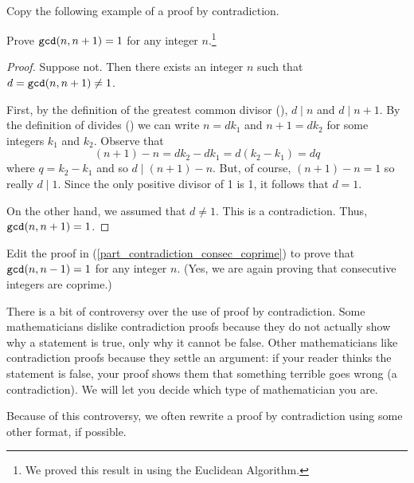 \begin{act}
\label{act_proof_contradiction}
~
    \begin{actpart}
        \item \label{part_contradiction_consec_coprime} Copy the following example of a proof by contradiction.

        Prove $\texttt{gcd}(n,n+1)=1$ for any integer $n$.\footnote{We proved this result in  using the Euclidean Algorithm.}   

        \begin{proof} Suppose not. Then there exists an integer $n$ such that $d=\texttt{gcd}(n,n+1)\neq 1$. 
        
        First, by the definition of the greatest common divisor (), $d \mid n$ and $d \mid n+1$.  By the definition of divides () we can write $n = dk_1$ and $n+1 = dk_2$ for some integers $k_1$ and $k_2$.  Observe that $$(n+1) - n = dk_2 - dk_1 = d(k_2-k_1)=dq$$ where $q = k_2-k_1$ and so $d \mid (n+1)-n$.  But, of course, $(n+1)-n=1$ so really $d \mid 1$. Since the only positive divisor of 1 is 1, it follows that $d =1$.  

        On the other hand, we assumed that $d \neq 1$.  This is a contradiction. Thus, $\texttt{gcd}(n,n+1)=1$.
        \end{proof}
     
         \item Edit the proof in (\ref{part_contradiction_consec_coprime}) to prove that $\texttt{gcd}(n,n-1) = 1$ for any integer $n$. (Yes, we are again proving that consecutive integers are coprime.)
    \end{actpart}
\end{act}

There is a bit of controversy over the use of proof by contradiction.  Some mathematicians dislike contradiction proofs because they do not actually show why a statement is true, only why it cannot be false.  Other mathematicians like contradiction proofs because they settle an argument: if your reader thinks the statement is false, your proof shows them that something terrible goes wrong (a contradiction). We will let you decide which type of mathematician you are.

Because of this controversy, we often rewrite a proof by contradiction using some other format, if possible.  

